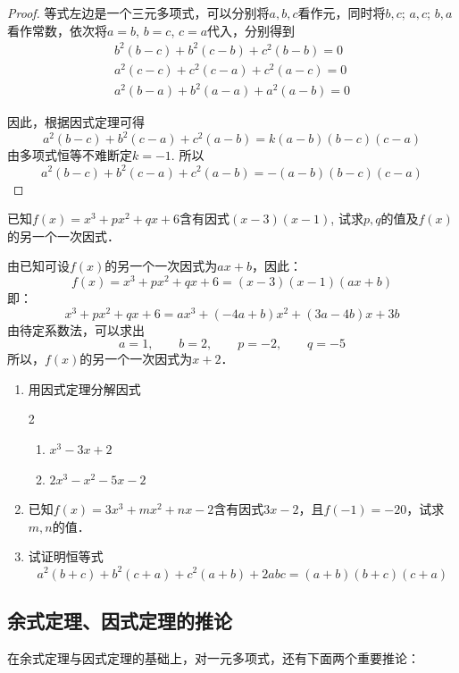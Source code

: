 \begin{proof}
等式左边是一个三元多项式，可以分别将$a,b,c$看作元，同时将$b,c$; $a,c$; $b,a$看作常数，依次将$a=b$, $b=c$, $c=a$代入，分别得到
\[\begin{split}
   b^2 (b-c) +b^2 (c-b) +c^2 (b-b) =0\\
   a^2 (c-c) +c^2 (c-a) +c^2 (a-c) =0\\
a^2(b-a)+ b^2(a-a) + a^2(a-b) =0 
\end{split}\]

因此，根据因式定理可得
\[a^2 (b-c) +b^2 (c-a) +c^2 (a-b)=k (a-b) (b-c)(c-a)\]
由多项式恒等不难断定$k=-1$. 所以
\[a^2 (b-c) +b^2 (c-a) +c^2 (a-b)
= -(a-b) (b-c)(c-a)\]
\end{proof}

\begin{example}
    已知$f(x)=x^3+px^2+qx+6$含有因式$(x-3)(x-1)$, 试求$p,q$的值及$f(x)$的另一个一次因式．
\end{example}

\begin{solution}
    由已知可设$f(x)$的另一个一次因式为$ax+b$，因此：
\[f(x)=x^3+px^2+qx+6=(x-3)(x-1)(ax+b)\]
即：
\[x^3+px^2+qx+6=ax^3+(-4a+b)x^2+(3a-4b)x+3b\]
由待定系数法，可以求出
\[a=1,\qquad b=2,\qquad p=-2,\qquad q=-5\]
所以，$f(x)$的另一个一次因式为$x+2$．
\end{solution}

\begin{ex}
\begin{enumerate}
    \item 用因式定理分解因式
\begin{multicols}{2}
\begin{enumerate}
    \item $x^3-3x+2$
    \item $2x^3-x^2-5x-2$
\end{enumerate}
\end{multicols}
    \item 已知$f(x)=3x^3+mx^2+nx-2$含有因式$3x-2$，且$f(-1)=-20$，试求$m,n$的值．
    \item 试证明恒等式
\[a^2(b+c)+b^2(c+a)+c^2(a+b)+2abc=(a+b)(b+c)(c+a)\]
\end{enumerate}  
\end{ex}

\subsection{余式定理、因式定理的推论}

在余式定理与因式定理的基础上，对一元多项式，还有下面两个重要推论：

